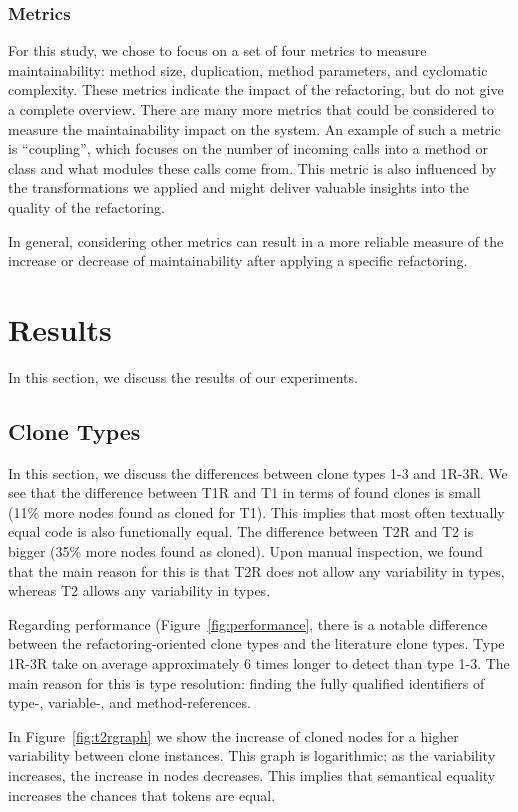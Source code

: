 \subsubsection{Metrics}
For this study, we chose to focus on a set of four metrics to measure maintainability: method size, duplication, method parameters, and cyclomatic complexity. These metrics indicate the impact of the refactoring, but do not give a complete overview. There are many more metrics that could be considered to measure the maintainability impact on the system. An example of such a metric is ``coupling'', which focuses on the number of incoming calls into a method or class and what modules these calls come from. This metric is also influenced by the transformations we applied and might deliver valuable insights into the quality of the refactoring.

In general, considering other metrics can result in a more reliable measure of the increase or decrease of maintainability after applying a specific refactoring.

\section{Results}
In this section, we discuss the results of our experiments.

\subsection{Clone Types}
In this section, we discuss the differences between clone types 1-3 and 1R-3R. We see that the difference between T1R and T1 in terms of found clones is small (11\% more nodes found as cloned for T1). This implies that most often textually equal code is also functionally equal. The difference between T2R and T2 is bigger (35\% more nodes found as cloned). Upon manual inspection, we found that the main reason for this is that T2R does not allow any variability in types, whereas T2 allows any variability in types.

Regarding performance (Figure~\ref{fig:performance}, there is a notable difference between the refactoring-oriented clone types and the literature clone types. Type 1R-3R take on average approximately 6 times longer to detect than type 1-3. The main reason for this is type resolution: finding the fully qualified identifiers of type-, variable-, and method-references.

In Figure~\ref{fig:t2rgraph} we show the increase of cloned nodes for a higher variability between clone instances. This graph is logarithmic: as the variability increases, the increase in nodes decreases. This implies that semantical equality increases the chances that tokens are equal.

